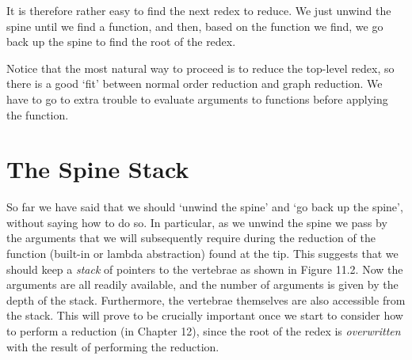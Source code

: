 It is therefore rather easy to find the next redex to reduce. We just unwind
the spine until we find a function, and then, based on the function we find, we
go back up the spine to find the root of the redex.

Notice that the most natural way to proceed is to reduce the top-level redex,
so there is a good `fit' between normal order reduction and graph reduction.
We have to go to extra trouble to evaluate arguments to functions before
applying the function.

\section{The Spine Stack}

So far we have said that we should `unwind the spine' and `go back up the
spine', without saying how to do so. In particular, as we unwind the spine we
pass by the arguments that we will subsequently require during the reduction
of the function (built-in or lambda abstraction) found at the tip. This suggests
that we should keep a \textit{stack} of pointers to the vertebrae as shown in Figure
11.2. Now the arguments are all readily available, and the number of
arguments is given by the depth of the stack. Furthermore, the vertebrae
themselves are also accessible from the stack. This will prove to be crucially
important once we start to consider how to perform a reduction (in Chapter
12), since the root of the redex is \textit{overwritten} with the result of performing the
reduction.


